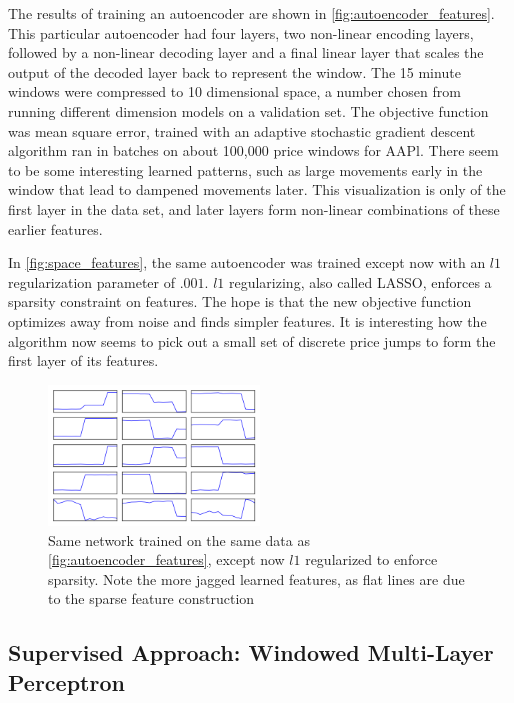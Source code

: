 \documentclass{article}
\begin{document}
The results of training an autoencoder are shown in \ref{fig:autoencoder_features}.
This particular autoencoder had four layers, two non-linear encoding layers, followed
by a non-linear decoding layer and a final linear layer that scales the output of the
decoded layer back to represent the window. The 15 minute windows
were compressed to 10 dimensional space, a number chosen from
running different dimension models on a validation set. The objective function 
was mean square
error, trained with an adaptive stochastic gradient descent algorithm ran in
batches on about 100,000 price windows for AAPl. 
There seem to be some interesting learned patterns, such as large
movements early in the window that lead to dampened movements later. This
visualization is only of the first layer in the data set, and later layers form
non-linear combinations of these earlier features.

In \ref{fig:space_features}, the same autoencoder was trained except now with
an $l1$ regularization parameter of $.001$. $l1$ regularizing, also called LASSO,
enforces a sparsity constraint on features. The hope is that the new objective
function optimizes away from noise and finds simpler features. It is interesting
how the algorithm now seems to pick out a small set of discrete price jumps
to form the first layer of its features.

\begin{figure}[h]
    \includegraphics[width=0.5\textwidth]{sparse_features}
    \caption{Same network trained on the same data as \ref{fig:autoencoder_features},
    except now $l1$ regularized to enforce sparsity. Note the more jagged learned
    features, as flat lines are due to the sparse feature construction}
    \label{fig:sparse_features}
\end{figure}

\subsection{Supervised Approach: Windowed Multi-Layer Perceptron}
\end{document}
